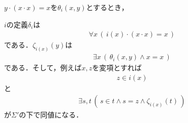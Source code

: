 \documentclass[a4j,10.5pt,oneside,openany]{jsbook}
\theoremstyle{mystyle}
\begin{document}
	\begin{screen}
		$y \cdot (x \cdot x) = x$を$\theta_{i}(x,y)$とするとき，
	\end{screen}
	
	$i$の定義$\delta_{i}$は
	\begin{align}
		\forall x\, \left(\, i(x) \cdot (x \cdot x) = x\, \right)
	\end{align}
	である．$\zeta_{i(x)}(y)$は
	\begin{align}
		\exists x\, \left(\, \theta_{i}(x,y) \wedge x = x\, \right)
	\end{align}
	である．そして，例えば$x,z$を変項とすれば
	\begin{align}
		z \in i(x)
	\end{align}
	と
	\begin{align}
		\exists s,t\, \left(\, s \in t \wedge s = z \wedge \zeta_{i(x)}(t)\, \right)
	\end{align}
	が$\Sigma'$の下で同値になる．
\end{document}

